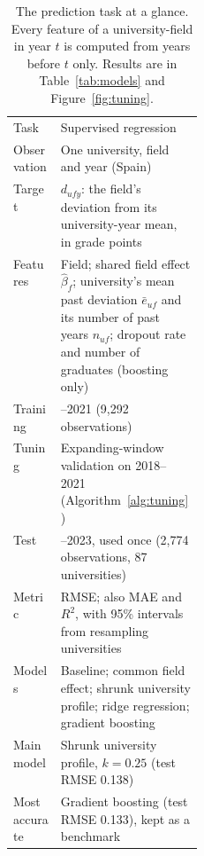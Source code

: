 \begin{table}[t]
\centering
\caption{The prediction task at a glance. Every feature of a university-field in year $t$ is computed from years before $t$ only. Results are in Table~\ref{tab:models} and Figure~\ref{fig:tuning}.}
\label{tab:mlsetup}
\small
\setlength{\tabcolsep}{4pt}
\begin{tabularx}{\linewidth}{@{}>{\raggedright\arraybackslash}p{0.25\linewidth} >{\raggedright\arraybackslash}X@{}}
\toprule
Task & Supervised regression \\
Observation & One university, field and year (Spain) \\
Target & $d_{ufy}$: the field's deviation from its university-year mean, in grade points \\
Features & Field; shared field effect $\hat\beta_f$; university's mean past deviation $\bar e_{uf}$ and its number of past years $n_{uf}$; dropout rate and number of graduates (boosting only) \\
Training & 2015--2021 (9,292 observations) \\
Tuning & Expanding-window validation on 2018--2021 (Algorithm~\ref{alg:tuning}) \\
Test & 2022--2023, used once (2,774 observations, 87 universities) \\
Metric & RMSE; also MAE and $R^2$, with 95\% intervals from resampling universities \\
Models & Baseline; common field effect; shrunk university profile; ridge regression; gradient boosting \\
Main model & Shrunk university profile, $k = 0.25$ (test RMSE 0.138) \\
Most accurate & Gradient boosting (test RMSE 0.133), kept as a benchmark \\
\bottomrule
\end{tabularx}
\end{table}
